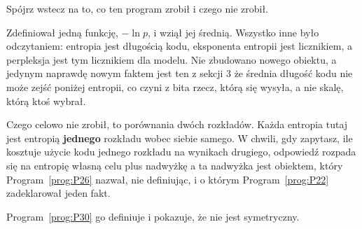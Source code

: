 \begin{fr}
Spójrz wstecz na to, co ten program zrobił i czego nie zrobił.

Zdefiniował jedną funkcję, $-\ln p$, i wziął jej średnią. Wszystko inne było
odczytaniem: entropia jest długością kodu, eksponenta entropii jest licznikiem,
a perpleksja jest tym licznikiem dla modelu. Nie zbudowano nowego obiektu, a
jedynym naprawdę nowym faktem jest ten z sekcji 3 \dash{} że średnia długość
kodu nie może zejść poniżej entropii, co czyni z bita rzecz, którą się wysyła,
a nie skalę, którą ktoś wybrał.

Czego celowo nie zrobił, to porównania dwóch rozkładów. Każda entropia tutaj
jest entropią \textbf{jednego} rozkładu wobec siebie samego. W chwili, gdy
zapytasz, ile kosztuje użycie kodu jednego rozkładu na wynikach drugiego,
odpowiedź rozpada się na entropię własną celu plus nadwyżkę \dash{} a ta
nadwyżka jest obiektem, który Program~\ref{prog:P26} nazwał, nie definiując, i
o którym Program~\ref{prog:P22} zadeklarował jeden fakt.

Program~\ref{prog:P30} go definiuje i pokazuje, że nie jest symetryczny.
\end{fr}

